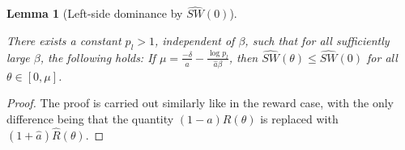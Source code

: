 \documentclass[10pt,a4paper]{amsart}
\newtheorem{lemma}{Lemma}
\newtheorem{claim}{Claim}
\begin{document}
\begin{lemma}[Left-side dominance by $\widehat{SW}(0)$]
\label{lem:lower_bound_p}

There exists a constant $p_l > 1$, independent of $\beta$, such that for all sufficiently large $\beta$, the following holds: If $\mu = \frac{-\delta}{\hat{a}} - \frac{\log p_l}{\hat{a}\beta}$, then $\widehat{SW}(\theta) \le \widehat{SW}(0)$ for all $\theta \in [0, \mu]$.
\end{lemma}

\begin{proof}
The proof is carried out similarly like in the reward case, with the only difference being that the quantity $(1-a)R(\theta)$ is replaced with $(1+\hat{a})\hat{R}(\theta)$.






\end{proof}
\end{document}
